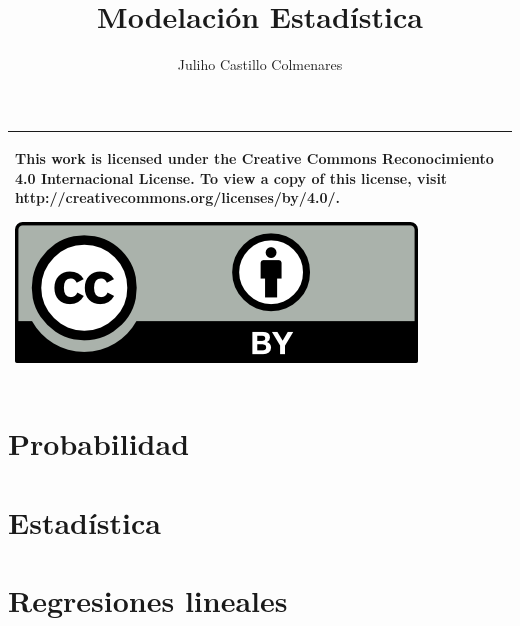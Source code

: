 \documentclass[
]{tufte-book}
\title{Modelación Estadística}
\author{Juliho Castillo Colmenares}
\begin{document}
	\maketitle
\begin{tabular}{|p{}|}
	\hline
	This work is licensed under the Creative Commons Reconocimiento 4.0 Internacional License. To view a copy of this license, visit
	http://creativecommons.org/licenses/by/4.0/.
	\begin{center}
		\includegraphics[scale=1]{./licencia/by.png}
	\end{center}\\
	\hline
\end{tabular}
\tableofcontents

\chapter{Probabilidad}








\chapter{Estadística}










\chapter{Regresiones lineales}










\end{document}
